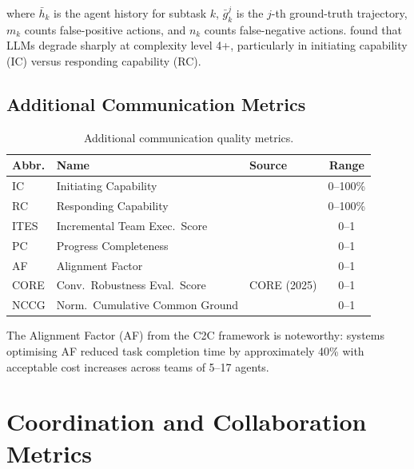\documentclass[11pt,a4paper]{article}
\begin{document}
where $\bar{h}_k$ is the agent history for subtask $k$, $\bar{g}_k^j$ is the $j$-th
ground-truth trajectory, $m_k$ counts false-positive actions, and $n_k$ counts
false-negative actions. \citet{collab_overcooked2025} found that LLMs degrade sharply
at complexity level 4+, particularly in initiating capability (IC) versus responding
capability (RC).

\subsection{Additional Communication Metrics}

\begin{table}[h!]
  \centering
  \caption{Additional communication quality metrics.}
  \label{tab:comm_metrics}
  \small
  \begin{tabular}{lllc}
    \toprule
    \textbf{Abbr.} & \textbf{Name} & \textbf{Source} & \textbf{Range} \\
    \midrule
    IC   & Initiating Capability          & \citet{collab_overcooked2025} & 0--100\% \\
    RC   & Responding Capability          & \citet{collab_overcooked2025} & 0--100\% \\
    ITES & Incremental Team Exec.\ Score  & \citet{collab_overcooked2025} & 0--1     \\
    PC   & Progress Completeness          & \citet{collab_overcooked2025} & 0--1     \\
    AF   & Alignment Factor               & \citet{c2c2025}               & 0--1     \\
    CORE & Conv.\ Robustness Eval.\ Score & CORE (2025)                   & 0--1     \\
    NCCG & Norm.\ Cumulative Common Ground& \citet{collab_deliberate2025} & 0--1     \\
    \bottomrule
  \end{tabular}
\end{table}

\noindent The Alignment Factor (AF) from the C2C framework \citep{c2c2025} is
noteworthy: systems optimising AF reduced task completion time by approximately 40\%
with acceptable cost increases across teams of 5--17 agents.

\section{Coordination and Collaboration Metrics}
\label{sec:coord}
\end{document}
